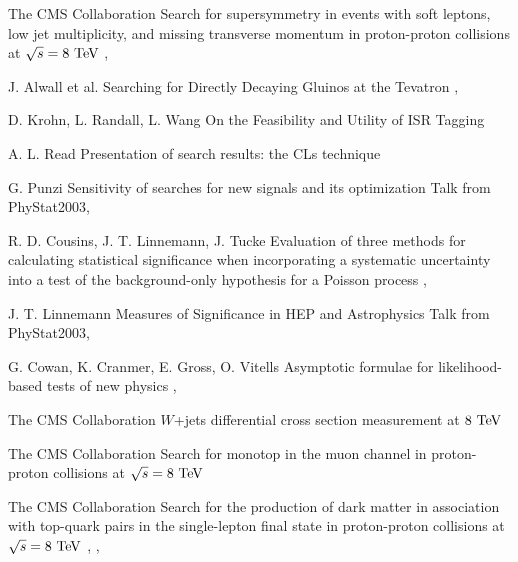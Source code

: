 {The CMS Collaboration}
{Search for supersymmetry in events with soft leptons, low jet multiplicity, and missing
transverse momentum in proton-proton collisions at $\sqrt{s} = 8~\text{TeV}$}
{, }

{J. Alwall et al.}
{Searching for Directly Decaying Gluinos at the Tevatron}
{, }

{D. Krohn, L. Randall, L. Wang}
{On the Feasibility and Utility of ISR Tagging}
{}


{A. L. Read}
{Presentation of search results: the CLs technique}
{}

{G. Punzi}
{Sensitivity of searches for new signals and its optimization}
{Talk from PhyStat2003, }

{R. D. Cousins, J. T. Linnemann, J. Tucke}
{Evaluation of three methods for calculating
statistical significance when incorporating a
systematic uncertainty into a test of the
background-only hypothesis for a Poisson
process}
{, }

{J. T. Linnemann}
{Measures of Significance in HEP and Astrophysics}
{Talk from PhyStat2003, }

{G. Cowan, K. Cranmer, E. Gross, O. Vitells}
{Asymptotic formulae for likelihood-based tests of new physics}
{, }


{The CMS Collaboration}
{$W$+jets differential cross section measurement at $8~\text{TeV}$}
{}

{The CMS Collaboration}
{Search for monotop in the muon channel in proton-proton collisions at $\sqrt{s} = 8~\text{TeV}$}
{}

{The CMS Collaboration}
{Search for the production of dark matter in association with top-quark pairs
in the single-lepton final state in proton-proton collisions at $\sqrt{s} = 8~\text{TeV}$}
{, , }


